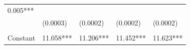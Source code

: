 \documentclass[]{book}
\begin{document}
\begin{longtable}[]{@{}lllll@{}}
\begin{minipage}[t]{0.18\columnwidth}
0.005***\strut
\end{minipage}\tabularnewline
\begin{minipage}[t]{0.15\columnwidth}\raggedright\strut
\strut
\end{minipage} & \begin{minipage}[t]{0.17\columnwidth}\raggedright\strut
(0.0003)\strut
\end{minipage} & \begin{minipage}[t]{0.17\columnwidth}\raggedright\strut
(0.0002)\strut
\end{minipage} & \begin{minipage}[t]{0.18\columnwidth}\raggedright\strut
(0.0002)\strut
\end{minipage} & \begin{minipage}[t]{0.18\columnwidth}\raggedright\strut
(0.0002)\strut
\end{minipage}\tabularnewline
\begin{minipage}[t]{0.15\columnwidth}\raggedright\strut
\strut
\end{minipage} & \begin{minipage}[t]{0.17\columnwidth}\raggedright\strut
\strut
\end{minipage} & \begin{minipage}[t]{0.17\columnwidth}\raggedright\strut
\strut
\end{minipage} & \begin{minipage}[t]{0.18\columnwidth}\raggedright\strut
\strut
\end{minipage} & \begin{minipage}[t]{0.18\columnwidth}\raggedright\strut
\strut
\end{minipage}\tabularnewline
\begin{minipage}[t]{0.15\columnwidth}\raggedright\strut
Constant\strut
\end{minipage} & \begin{minipage}[t]{0.17\columnwidth}\raggedright\strut
11.058***\strut
\end{minipage} & \begin{minipage}[t]{0.17\columnwidth}\raggedright\strut
11.206***\strut
\end{minipage} & \begin{minipage}[t]{0.18\columnwidth}\raggedright\strut
11.452***\strut
\end{minipage} & \begin{minipage}[t]{0.18\columnwidth}\raggedright\strut
11.623***\strut
\end{minipage}\tabularnewline

\end{longtable}
\end{document}
